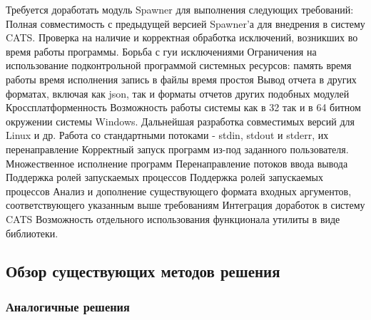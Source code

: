 \documentclass{imcs}
\begin{document}
Требуется доработать модуль Spawner для выполнения следующих требований:
Полная совместимость с предыдущей версией Spawner’а для внедрения в систему CATS.
Проверка на наличие и корректная обработка исключений, возникших во время работы программы.
Борьба с гуи исключениями
Ограничения на использование подконтрольной программой системных ресурсов:
память
время работы
время исполнения
запись в файлы
время простоя
Вывод отчета в других форматах, включая как json, так и форматы отчетов других подобных модулей
Кроссплатформенность
Возможность работы системы как в 32 так и в 64 битном окружении системы Windows.
Дальнейшая разработка совместимых версий для Linux и др.
Работа со стандартными потоками - stdin, stdout и stderr, их перенаправление
Корректный запуск программ из-под заданного пользователя.
Множественное исполнение программ
Перенаправление потоков ввода вывода
Поддержка ролей запускаемых процессов
Поддержка ролей запускаемых процессов
Анализ и дополнение существующего формата входных аргументов, соответствующего указанным выше требованиям
Интеграция доработок в систему CATS
Возможность отдельного использования функционала утилиты в виде библиотеки.


\subsection{Обзор существующих методов решения}

\subsubsection{Аналогичные решения}
\end{document}
